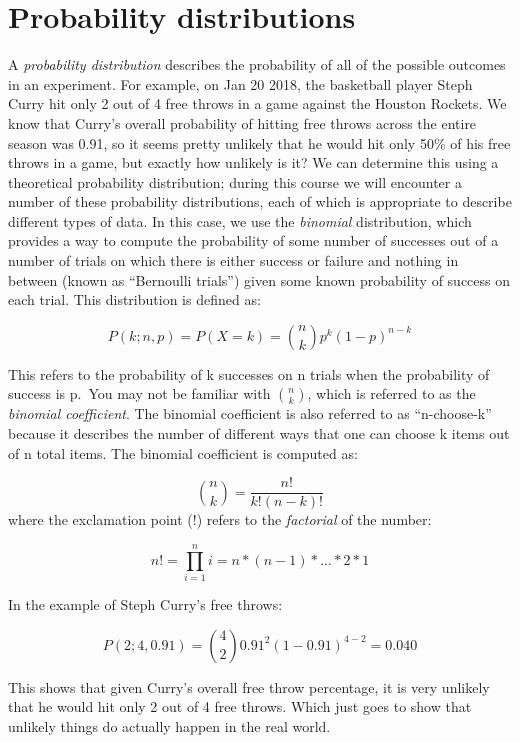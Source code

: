 \documentclass[12pt,]{book}
\theoremstyle{definition}
\theoremstyle{definition}
\theoremstyle{definition}
\theoremstyle{remark}
\begin{document}
\hypertarget{probability-distributions}{%
\section{Probability distributions}\label{probability-distributions}}

A \emph{probability distribution} describes the probability of all of the possible outcomes in an experiment. For example, on Jan 20 2018, the basketball player Steph Curry hit only 2 out of 4 free throws in a game against the Houston Rockets. We know that Curry's overall probability of hitting free throws across the entire season was 0.91, so it seems pretty unlikely that he would hit only 50\% of his free throws in a game, but exactly how unlikely is it? We can determine this using a theoretical probability distribution; during this course we will encounter a number of these probability distributions, each of which is appropriate to describe different types of data. In this case, we use the \emph{binomial} distribution, which provides a way to compute the probability of some number of successes out of a number of trials on which there is either success or failure and nothing in between (known as ``Bernoulli trials'') given some known probability of success on each trial. This distribution is defined as:

\[
P(k; n,p) = P(X=k) = \binom{n}{k} p^k(1-p)^{n-k}
\]

This refers to the probability of k successes on n trials when the probability of success is p.~You may not be familiar with \(\binom{n}{k}\), which is referred to as the \emph{binomial coefficient}. The binomial coefficient is also referred to as ``n-choose-k'' because it describes the number of different ways that one can choose k items out of n total items. The binomial coefficient is computed as:

\[
\binom{n}{k} = \frac{n!}{k!(n-k)!}
\]
where the exclamation point (!) refers to the \emph{factorial} of the number:

\[
n! = \prod_{i=1}^n i = n*(n-1)*...*2*1 
\]

In the example of Steph Curry's free throws:

\[
P(2;4,0.91) = \binom{4}{2} 0.91^2(1-0.91)^{4-2} = 0.040
\]

This shows that given Curry's overall free throw percentage, it is very unlikely that he would hit only 2 out of 4 free throws. Which just goes to show that unlikely things do actually happen in the real world.
\end{document}
